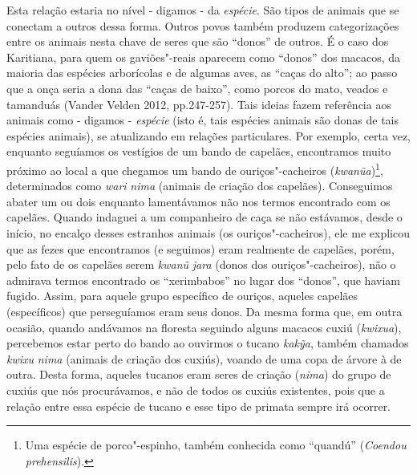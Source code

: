 Esta relação estaria no nível - digamos - da \emph{espécie}. São tipos
de animais que se conectam a outros dessa forma. Outros povos também
produzem categorizações entre os animais nesta chave de seres que são
``donos'' de outros. É o caso dos Karitiana, para quem os gaviões"-reais
aparecem como ``donos'' dos macacos, da maioria das espécies arborícolas
e de algumas aves, as ``caças do alto''; ao passo que a onça seria a
dona das ``caças de baixo'', como porcos do mato, veados e tamanduás
(Vander Velden 2012, pp.247-257). Tais ideias fazem referência aos
animais como - digamos - \emph{espécie} (isto é, tais espécies animais
são donas de tais espécies animais), se atualizando em relações
particulares. Por exemplo, certa vez, enquanto seguíamos os vestígios de
um bando de capelães, encontramos muito próximo ao local a que chegamos
um bando de ouriços"-cacheiros (\emph{kwanũa})\footnote{Uma espécie de
  porco"-espinho, também conhecida como ``quandú'' (\emph{Coendou
  prehensilis}).}, determinados como \emph{wari} \emph{nima} (animais de
criação dos capelães). Conseguimos abater um ou dois enquanto
lamentávamos não nos termos encontrado com os capelães. Quando indaguei
a um companheiro de caça se não estávamos, desde o início, no encalço
desses estranhos animais (os ouriços"-cacheiros), ele me explicou que as
fezes que encontramos (e seguimos) eram realmente de capelães, porém,
pelo fato de os capelães serem \emph{kwanũ} \emph{jara} (donos dos
ouriços"-cacheiros), não o admirava termos encontrado os ``xerimbabos'' no
lugar dos ``donos'', que haviam fugido. Assim, para aquele grupo
específico de ouriços, aqueles capelães (específicos) que perseguíamos
eram seus donos. Da mesma forma que, em outra ocasião, quando andávamos
na floresta seguindo alguns macacos cuxiú (\emph{kwixua}), percebemos
estar perto do bando ao ouvirmos o tucano \emph{kakỹa}, também chamados
\emph{kwixu} \emph{nima} (animais de criação dos cuxiús), voando de uma
copa de árvore à de outra. Desta forma, aqueles tucanos eram seres de
criação (\emph{nima}) do grupo de cuxiús que nós procurávamos, e não de
todos os cuxiús existentes, pois que a relação entre essa espécie de
tucano e esse tipo de primata sempre irá ocorrer.

